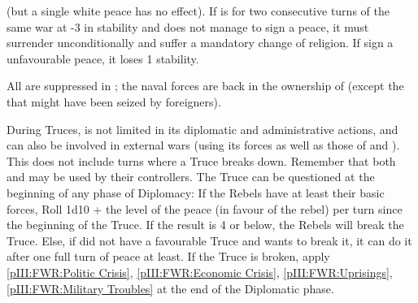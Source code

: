 \begin{digressions}
  (but a single white peace has no effect).
  \aparag If \FRA is for two consecutive turns of the same war at -3 in
  stability and does not manage to sign a peace, it must surrender
  unconditionally and suffer a mandatory change of religion.
  \aparag If \FRA sign a unfavourable peace, it loses 1 stability.

   All \REVOLT are suppressed in \FRA; the naval
  forces are back in the ownership of \FRA (except the \DN that might have
  been seized by foreigners).

  \phdipl
  \aparag During Truces, \FRA is not limited in its diplomatic and
  administrative actions, and can also be involved in external wars (using its
  forces as well as those of \lig and \hug). This does not include turns where
  a Truce breaks down. Remember that both \lig and \hug may be used by their
  controllers.
  \aparag The Truce can be questioned at the beginning of any phase of
  Diplomacy:
  \bparag If the Rebels have at least their basic forces, Roll 1d10
  + %
  the level of the peace (in favour of the rebel)  per turn since
  the beginning of the Truce. If the result is 4 or below, the Rebels will
  break the Truce.
  \bparag Else, if \FRA did not have a favourable Truce and wants to break it,
  it can do it after one full turn of peace at least.
  \bparag If the Truce is broken, apply \ref{pIII:FWR:Politic Crisis},
  \ref{pIII:FWR:Economic Crisis}, \ref{pIII:FWR:Uprisings},
  \ref{pIII:FWR:Military Troubles} at the end of the Diplomatic phase.
\end{digressions}



